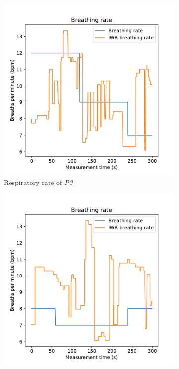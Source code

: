 \begin{figure}[t]
\centering
\begin{subfigure}{.45\textwidth}
  \centering
  \includegraphics[width=\linewidth]{figures/validation/roy4_breath.pdf}  
  \caption{Respiratory rate of \emph{P3}}
  \label{fig:roy4_breath}
\end{subfigure}
\begin{subfigure}{.45\textwidth}
  \centering
  \includegraphics[width=\linewidth]{figures/validation/nick4_breath.pdf}  

\end{subfigure}
\end{figure}
